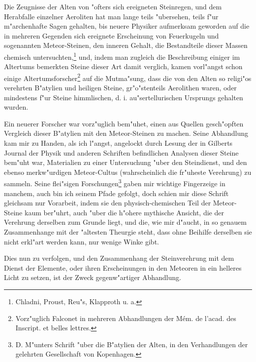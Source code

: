 \documentclass[a4paper, 11pt, oneside, polutonikogreek, german]{article}
\begin{document}
Die Zeugnisse der Alten von "ofters sich ereigneten Steinregen, und dem Herabfalle einzelner Aeroliten hat man lange teils "ubersehen, teils f"ur m"archenhafte Sagen gehalten, bis neuere Physiker aufmerksam geworden auf die in mehreren Gegenden sich ereignete Erscheinung von Feuerkugeln und sogenannten Meteor-Steinen, den inneren Gehalt, die Bestandteile dieser Massen chemisch untersuchten,\footnote{Chladni, Proust, Reu"s, Klapproth u. a.} und, indem man zugleich die Beschreibung einiger im Altertums bemerkten Steine dieser Art damit verglich, kamen vorl"angst schon einige Altertumsforscher\footnote{Vorz"uglich Falconet in mehreren Abhandlungen der Mém. de l'acad. des Inscript. et belles lettres.} auf die Mutma"sung, dass die von den Alten so religi"os verehrten B"atylien und heiligen Steine, gr"o"stenteils Aerolithen waren, oder mindestens f"ur Steine himmlischen, d. i. au"sertellurischen Ursprungs gehalten wurden.

Ein neuerer Forscher war vorz"uglich bem"uhet, einen aus Quellen gesch"opften Vergleich dieser B"atylien mit den Meteor-Steinen zu machen. Seine Abhandlung kam mir zu Handen, als ich l"angst, angelockt durch Lesung der in Gilberts Journal der Physik und anderen Schriften befindlichen Analysen dieser Steine bem"uht war, Materialien zu einer Untersuchung "uber den Steindienst, und den ebenso merkw"urdigen Meteor-Cultus (wahrscheinlich die fr"uheste Verehrung) zu sammeln. Seine flei"sigen Forschungen\footnote{D. M"unters Schrift "uber die B"atylien der Alten, in den Verhandlungen der gelehrten Gesellschaft von Kopenhagen.} gaben mir wichtige Fingerzeige in manchem, auch bin ich seinem Pfade gefolgt, doch schien mir diese Schrift gleichsam nur Vorarbeit, indem sie den physisch-chemischen Teil der Meteor-Steine kaum ber"uhrt, auch "uber die h"ohere mythische Ansicht, die der Verehrung derselben zum Grunde liegt, und die, wie mir d"aucht, in so genauem Zusammenhange mit der "altesten Theurgie steht, dass ohne Beihilfe derselben sie nicht erkl"art werden kann, nur wenige Winke gibt.

Dies nun zu verfolgen, und den Zusammenhang der Steinverehrung mit dem Dienst der Elemente, oder ihren Erscheinungen in den Meteoren in ein helleres Licht zu setzen, ist der Zweck gegenw"artiger Abhandlung.
\clearpage
\end{document}
